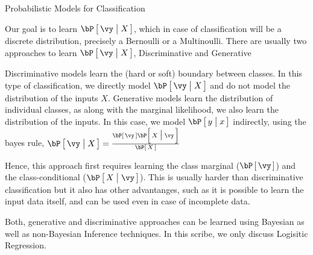\documentclass{article}
\begin{document}
\makeheader

\begin{ssection}{Probabilistic Models for Classification}

	Our goal is to learn $\prob{\vy \pipe X}$, which in case of classification will be a discrete distribution, precisely a Bernoulli or a Multinoulli. There are usually two approaches to learn $\prob{\vy \pipe X}$, \ie Discriminative and Generative

	\begin{enumerate}[label=\bt{\theenumi.}]
		 Discriminative models learn the (hard or soft) boundary between classes. In this type of classification, we directly model $\prob{\vy \pipe X}$ and do not model the distribution of the inputs $X$.
		 Generative models learn the distribution of individual classes, as along with the marginal likelihood, we also learn the distribution of the inputs. In this case, we model $\prob{y \pipe x}$ indirectly, using the bayes rule, \ie $\prob{\vy \pipe X} = \frac{\prob{\vy} \prob{X \pipe \vy}}{\prob{X}}$

			Hence, this approach first requires learning the class marginal ($\prob{\vy}$) and the class-conditional ($\prob{X \pipe \vy}$). This is usually harder than discriminative classification but it also has other advantanges, such as it is possible to learn the input data itself, and can be used even in case of incomplete data.
	\end{enumerate}

	Both, generative and discriminative approaches can be learned using Bayesian as well as non-Bayesian Inference techniques. In this scribe, we only discuss Logisitic Regression.

\end{ssection}
\end{document}
